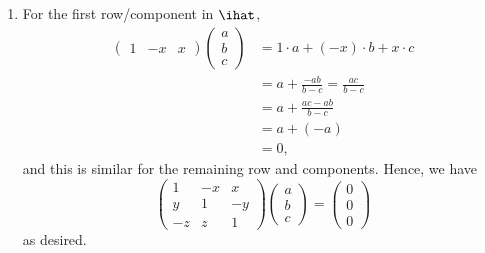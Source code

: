 \Question{\currfilebase}
\begin{enumerate}
    \item For the first row/component in \(\ihat\),
          \begin{align*}
              \begin{pmatrix}
                  1 & -x & x
              \end{pmatrix}
              \begin{pmatrix}
                  a \\ b \\ c
              \end{pmatrix} & = 1 \cdot a + (-x) \cdot b + x \cdot c       \\
                              & = a + \frac{-ab}{b - c} = \frac{ac}{b - c} \\
                              & = a + \frac{ac - ab}{b - c}                \\
                              & = a + (-a)                                 \\
                              & = 0,
          \end{align*}
          and this is similar for the remaining row and components. Hence, we have
          \[
              \begin{pmatrix}
                  1  & -x & x  \\
                  y  & 1  & -y \\
                  -z & z  & 1
              \end{pmatrix}
              \begin{pmatrix}
                  a \\
                  b \\
                  c
              \end{pmatrix}
              = \begin{pmatrix}
                  0 \\
                  0 \\
                  0
              \end{pmatrix}
          \]
          as desired.


\end{enumerate}
